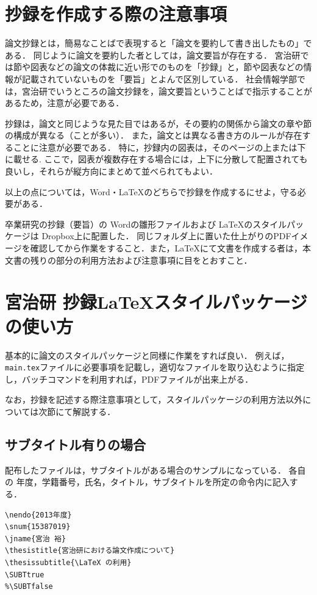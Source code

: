 
\section{抄録を作成する際の注意事項}
論文抄録とは，簡易なことばで表現すると「論文を要約して書き出したもの」である．
同じように論文を要約した者としては，論文要旨が存在する．
宮治研では節や図表などの論文の体裁に近い形でのものを「抄録」と，節や図表などの情報が記載されていないものを「要旨」とよんで区別している．
社会情報学部では，宮治研でいうところの論文抄録を，論文要旨ということばで指示することがあるため，注意が必要である．

抄録は，論文と同じような見た目ではあるが，その要約の関係から論文の章や節の構成が異なる（ことが多い）．
また，論文とは異なる書き方のルールが存在することに注意が必要である．
特に，抄録内の図表は，そのページの上または下に載せる.
ここで，図表が複数存在する場合には，上下に分散して配置されても良いし，それらが縦方向にまとめて並べられてもよい．

以上の点については，Word・\LaTeX のどちらで抄録を作成するにせよ，守る必要がある．

卒業研究の抄録（要旨）の Wordの雛形ファイルおよび \LaTeX のスタイルパッケージは Dropbox上に配置した．
同じフォルダ上に置いた仕上がりのPDFイメージを確認してから作業をすること．また，\LaTeX にて文書を作成する者は，本文書の残りの部分の利用方法および注意事項に目をとおすこと．


\section{宮治研 抄録\LaTeX スタイルパッケージの使い方}
基本的に論文のスタイルパッケージと同様に作業をすれば良い．
例えば，\verb+main.tex+ファイルに必要事項を記載し，適切なファイルを取り込むように指定し，バッチコマンドを利用すれば，PDFファイルが出来上がる．

なお，抄録を記述する際注意事項として，スタイルパッケージの利用方法以外については次節にて解説する．

\subsection{サブタイトル有りの場合}
配布したファイルは，サブタイトルがある場合のサンプルになっている．
各自の 年度，学籍番号，氏名，タイトル，サブタイトルを所定の命令内に記入する．
\begin{screen}
{\small
\begin{verbatim}
\nendo{2013年度}
\snum{15387019}
\jname{宮治 裕}
\thesistitle{宮治研における論文作成について}
\thesissubtitle{\LaTeX の利用}
\SUBTtrue
%\SUBTfalse
\end{verbatim}
}
\end{screen}

